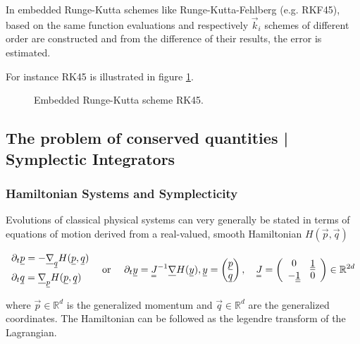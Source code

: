 In embedded Runge-Kutta schemes like Runge-Kutta-Fehlberg (e.g. RKF45), based on the same function evaluations
and respectively $\vec{k}_i$ schemes of different order are constructed and from the difference of their results,
the error is estimated.

For instance RK45 is illustrated in figure \ref{fig:rk45}.

\begin{figure}[!htb]
  \centering
  \hfill
  \caption{Embedded Runge-Kutta scheme RK45.}
  \label{fig:rk45}
\end{figure}

\subsection{The problem of conserved quantities | Symplectic Integrators}
\subsubsection{Hamiltonian Systems and Symplecticity}
Evolutions of classical physical systems can very generally be stated in terms of equations of motion derived from a real-valued, smooth Hamiltonian $H(\vec{p},\vec{q})$

\begin{equation}
\begin{aligned}
& \partial_t \vec{p}=-\vec{\nabla}_{\vec{q}} H(\vec{p}, \vec{q}) \\
& \partial_t \vec{q}=\vec{\nabla}_{\vec{p}} H(\vec{p}, \vec{q})
\end{aligned} \quad \text { or } \quad \partial_t \vec{y}=\mat{J}^{-1} \vec{\nabla} H(\vec{y}), \vec{y}=\begin{pmatrix} \vec{p} \\ \vec{q} \end{pmatrix}, \quad \mat{J}=\left(\begin{array}{cc}
0 & \underline{\underline{1}} \\
-\underline{\underline{1}} & 0
\end{array}\right) \in \mathbb{R}^{2d}
\end{equation}

where $\vec{p} \in \mathbb{R}^d$ is the generalized momentum and $\vec{q} \in \mathbb{R}^d$ are the generalized coordinates. The Hamiltonian
can be followed as the legendre transform of the Lagrangian.

